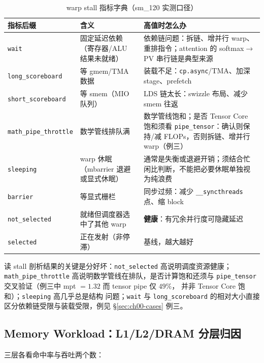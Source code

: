 \begin{table}[htbp]
\centering
\caption{warp stall 指标字典（sm\_120 实测口径）}
\label{tab:00-stall}
\begin{tabular}{lp{5.2cm}p{5.6cm}}
\toprule
指标后缀 & 含义 & 高值时怎么办 \\
\midrule
\texttt{wait} & 固定延迟依赖（寄存器/ALU 结果未就绪） & 依赖链问题：拆链、增并行 warp、重排指令；attention 的 softmax$\to$PV 串行链是典型来源 \\
\texttt{long\_\allowbreak{}scoreboard} & 等 gmem/TMA 数据 & 装载不足：\texttt{cp.async}/TMA、加深 stage、prefetch \\
\texttt{short\_\allowbreak{}scoreboard} & 等 smem（MIO 队列） & LDS 链太长：swizzle 布局、减少 smem 往返 \\
\texttt{math\_\allowbreak{}pipe\_\allowbreak{}throttle} & 数学管线排队满 & 数学管线饱和；是否 Tensor Core 饱和须看 \texttt{pipe\_\allowbreak{}tensor}：确认则保持/减 FLOPs，否则拆链、增并行 warp（例三） \\
\texttt{sleeping} & warp 休眠（mbarrier 退避或显式休眠） & 通常是失衡或退避开销；须结合忙闲比判断，不能把必要休眠单独视为纯浪费 \\
\texttt{barrier} & 等显式栅栏 & 同步过频：减少 \texttt{\_\allowbreak{}\_\allowbreak{}syncthreads} 点、缩 block \\
\texttt{not\_\allowbreak{}selected} & 就绪但调度器选中了其他 warp & \textbf{健康}：有冗余并行度可隐藏延迟 \\
\texttt{selected} & 正在发射（非停滞） & 基线，越大越好 \\
\bottomrule
\end{tabular}
\end{table}

读 stall 剖析结果的关键是分好坏：\texttt{not\_\allowbreak{}selected} 高说明调度资源健康；
\texttt{math\_\allowbreak{}pipe\_\allowbreak{}throttle} 高说明数学管线在排队，是否计算饱和还须与
\texttt{pipe\_\allowbreak{}tensor} 交叉验证（例三中 mpt $=1.32$ 而 tensor pipe 仅 $49\%$，
并非 Tensor Core 饱和）；\texttt{sleeping} 高几乎总是结构
问题；\texttt{wait} 与 \texttt{long\_\allowbreak{}scoreboard} 的相对大小直接
区分依赖链受限与装载受限，例见 \S\ref{sec:ch00-cases} 例三。

\subsection{Memory Workload：L1/L2/DRAM 分层归因}

三层各看命中率与吞吐两个数：

